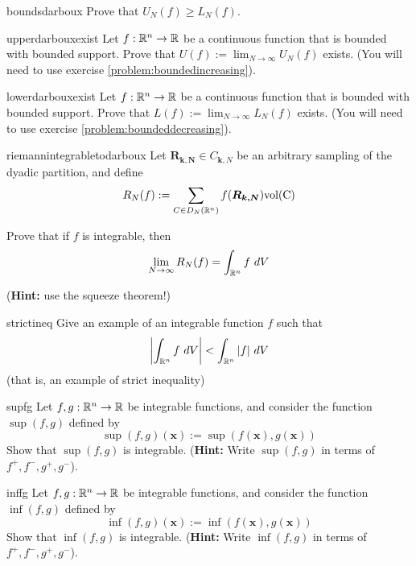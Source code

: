 \begin{problem}{boundsdarboux}
    Prove that $U_N(f) \geq L_N(f)$.
\end{problem}

\begin{problem}{upperdarbouxexist}
    Let $f: \mathbb{R}^n \to \mathbb{R}$ be a continuous function that is bounded with bounded support. Prove that $U(f) := \lim_{N \to \infty} U_N(f)$ exists.  (You will need to use exercise \ref{problem:boundedincreasing}).
    
\end{problem}

\begin{problem}{lowerdarbouxexist}
    Let $f: \mathbb{R}^n \to \mathbb{R}$ be a continuous function that is bounded with bounded support. Prove that $L(f) := \lim_{N \to \infty} L_N(f)$ exists. (You will need to use exercise \ref{problem:boundeddecreasing}).
\end{problem}

\begin{problem}{riemannintegrabletodarboux}
    Let $\bm{R_{k,N}} \in C_{\bm{k},N}$ be an arbitrary sampling of the dyadic partition, and define 
    $$R_N(f) := \sum_{C \in D_N(\mathbb{R}^n)} f(\bm{R_{k,N}}) \textnormal{vol(C)}$$
    
    Prove that if $f$ is integrable, then
    $$\lim_{N\to\infty} R_N(f) = \int_{\mathbb{R}^n}f \ dV $$

    (\textbf{Hint:} use the squeeze theorem!)
\end{problem}


\begin{problem}{strictineq}
    Give an example of an integrable function $f$ such that $$\left|\int_{\mathbb{R}^n} f \ dV\right| < \int_{\mathbb{R}^n} |f| \ dV$$
    (that is, an example of strict inequality)
\end{problem}

\begin{problem}{supfg}
    Let $f,g : \mathbb{R}^n \to \mathbb{R}$ be integrable functions, and consider the function $\sup(f,g)$ defined by $$\sup(f,g)(\bm{x}) := \sup(f(\bm{x}),g(\bm{x}))$$ Show that $\sup(f,g)$ is integrable.
    (\textbf{Hint:} Write $\sup(f,g)$ in terms of $f^+,f^-,g^+,g^-$).
\end{problem}

\begin{problem}{inffg}
    Let $f,g : \mathbb{R}^n \to \mathbb{R}$ be integrable functions, and consider the function $\inf(f,g)$ defined by $$\inf(f,g)(\bm{x}) := \inf(f(\bm{x}),g(\bm{x}))$$ Show that $\inf(f,g)$ is integrable.
    (\textbf{Hint:} Write $\inf(f,g)$ in terms of $f^+,f^-,g^+,g^-$).
\end{problem}



